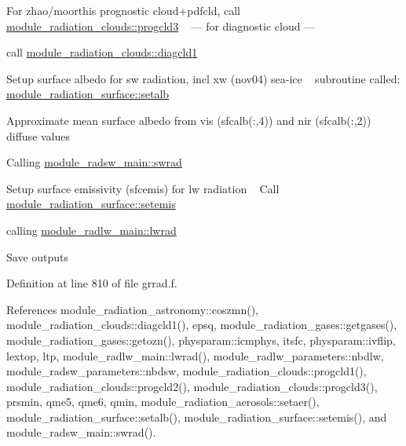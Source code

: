 \begin{DoxyEnumerate}
\begin{DoxyItemize}
\item For zhao/moorthi\textquotesingle{}s prognostic cloud+pdfcld, call \hyperlink{namespacemodule__radiation__clouds_a1953118ed22c3b6f8d94ef231b47a08b}{module\+\_\+radiation\+\_\+clouds\+::progcld3} ~\newline
 --- for diagnostic cloud ---
\item call \hyperlink{namespacemodule__radiation__clouds_ab477be986b08fe827c44dbe352a23d39}{module\+\_\+radiation\+\_\+clouds\+::diagcld1}
\end{DoxyItemize}
\item Setup surface albedo for sw radiation, incl xw (nov04) sea-\/ice ~\newline
 subroutine called\+: \hyperlink{namespacemodule__radiation__surface_a79d2feaf2f32435b179ef7bc86ad3f36}{module\+\_\+radiation\+\_\+surface\+::setalb}
\item Approximate mean surface albedo from vis (sfcalb(\+:,4)) and nir (sfcalb(\+:,2)) diffuse values
\item Calling \hyperlink{namespacemodule__radsw__main_ad9b28f997232642658b4d15a7eb70fcd}{module\+\_\+radsw\+\_\+main\+::swrad}
\item Setup surface emissivity (sfcemis) for lw radiation ~\newline
 Call \hyperlink{namespacemodule__radiation__surface_a0fdd0e9a9c536d3d41bd6b6c9d0a8675}{module\+\_\+radiation\+\_\+surface\+::setemis}
\item calling \hyperlink{namespacemodule__radlw__main_a072a355f2067d729d64d2997270e36b1}{module\+\_\+radlw\+\_\+main\+::lwrad}
\item Save outputs 
\end{DoxyEnumerate}

Definition at line 810 of file grrad.\+f.



References module\+\_\+radiation\+\_\+astronomy\+::coszmn(), module\+\_\+radiation\+\_\+clouds\+::diagcld1(), epsq, module\+\_\+radiation\+\_\+gases\+::getgases(), module\+\_\+radiation\+\_\+gases\+::getozn(), physparam\+::icmphys, itsfc, physparam\+::ivflip, lextop, ltp, module\+\_\+radlw\+\_\+main\+::lwrad(), module\+\_\+radlw\+\_\+parameters\+::nbdlw, module\+\_\+radsw\+\_\+parameters\+::nbdsw, module\+\_\+radiation\+\_\+clouds\+::progcld1(), module\+\_\+radiation\+\_\+clouds\+::progcld2(), module\+\_\+radiation\+\_\+clouds\+::progcld3(), prsmin, qme5, qme6, qmin, module\+\_\+radiation\+\_\+aerosols\+::setaer(), module\+\_\+radiation\+\_\+surface\+::setalb(), module\+\_\+radiation\+\_\+surface\+::setemis(), and module\+\_\+radsw\+\_\+main\+::swrad().



